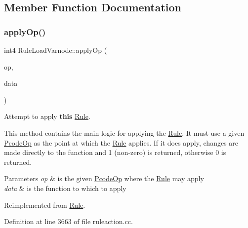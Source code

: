 \subsection{Member Function Documentation}
\mbox{\label{class_rule_load_varnode_aba1b981179387a727272c5ba7b407777}} 
\subsubsection{\texorpdfstring{applyOp()}{applyOp()}}
{\footnotesize\ttfamily int4 Rule\+Load\+Varnode\+::apply\+Op (\begin{DoxyParamCaption}\item[{\mbox{\hyperlink{class_pcode_op}{Pcode\+Op}} $\ast$}]{op,  }\item[{\mbox{\hyperlink{class_funcdata}{Funcdata}} \&}]{data }\end{DoxyParamCaption})\hspace{0.3cm}{\ttfamily [virtual]}}



Attempt to apply {\bfseries{this}} \mbox{\hyperlink{class_rule}{Rule}}. 

This method contains the main logic for applying the \mbox{\hyperlink{class_rule}{Rule}}. It must use a given \mbox{\hyperlink{class_pcode_op}{Pcode\+Op}} as the point at which the \mbox{\hyperlink{class_rule}{Rule}} applies. If it does apply, changes are made directly to the function and 1 (non-\/zero) is returned, otherwise 0 is returned. 
\begin{DoxyParams}{Parameters}
{\em op} & is the given \mbox{\hyperlink{class_pcode_op}{Pcode\+Op}} where the \mbox{\hyperlink{class_rule}{Rule}} may apply \\
\hline
{\em data} & is the function to which to apply \\
\hline
\end{DoxyParams}


Reimplemented from \mbox{\hyperlink{class_rule_a4e3e61f066670175009f60fb9dc60848}{Rule}}.



Definition at line 3663 of file ruleaction.\+cc.

